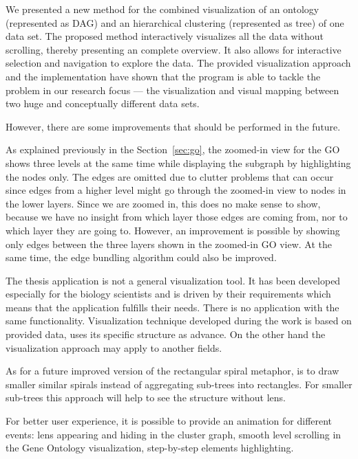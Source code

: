 
We presented a new method for the combined visualization of an ontology (represented as DAG)
and an hierarchical clustering (represented as tree) of one data set.
The proposed method interactively visualizes all the data without scrolling,
thereby presenting an complete overview.
It also allows for interactive selection and navigation to explore the data.
The provided visualization approach and the implementation have shown that the program is able to tackle the problem in our research focus ---
the visualization and visual mapping between two huge and conceptually different data sets.

However, there are some improvements that should be performed in the future.

As explained previously in the Section~\ref{sec:go}, the zoomed-in view for the GO shows three levels at the same time while displaying the subgraph by highlighting the nodes only.
The edges are omitted due to clutter problems that can occur since edges from a higher level might go through the zoomed-in view to nodes in the lower layers.
Since we are zoomed in, this does no make sense to show, because we have no insight from which layer those edges are coming from, nor to which layer they are going to.
However, an improvement is possible by showing only edges between the three layers shown in the zoomed-in GO view.
At the same time, the edge bundling algorithm could also be improved.

The thesis application is not a general visualization tool.
It has been developed especially for the biology scientists and is driven by their requirements which means that the application fulfills their needs.
There is no application with the same functionality.
Visualization technique developed during the work is based on provided data, uses its specific structure as advance.
On the other hand the visualization approach may apply to another fields.

As for a future improved version of the rectangular spiral metaphor, is to draw smaller similar spirals instead of aggregating sub-trees into rectangles.
For smaller sub-trees this approach will help to see the structure without lens.

For better user experience, it is possible to provide an animation for different events:
lens appearing and hiding in the cluster graph,
smooth level scrolling in the Gene Ontology visualization,
step-by-step elements highlighting.